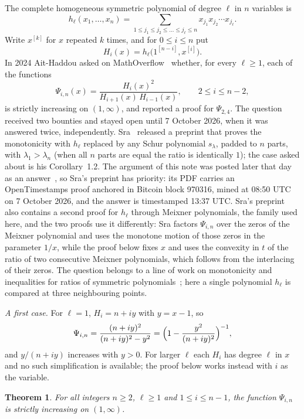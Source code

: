 \documentclass[11pt]{amsart}
\newtheorem{theorem}{Theorem}
\theoremstyle{remark}
\begin{document}
The complete homogeneous symmetric polynomial of degree $\ell$ in $n$ variables is
\[
h_\ell(x_1,\dots,x_n)=\sum_{1\le j_1\le j_2\le\dots\le j_\ell\le n}x_{j_1}x_{j_2}\cdots x_{j_\ell}.
\]
Write $x^{[k]}$ for $x$ repeated $k$ times, and for $0\le i\le n$ put
\[
H_i(x)=h_\ell\bigl(1^{[n-i]},x^{[i]}\bigr).
\]
In 2024 Ait-Haddou asked on MathOverflow~\cite{MO} whether, for every $\ell\ge1$, each of the functions
\[
\Psi_{i,n}(x)=\frac{H_i(x)^2}{H_{i+1}(x)\,H_{i-1}(x)},\qquad 2\le i\le n-2,
\]
is strictly increasing on $(1,\infty)$, and reported a proof for $\Psi_{2,4}$. The question received two bounties and stayed open until 7 October 2026, when it was answered twice, independently. Sra~\cite{SraT} released a preprint that proves the monotonicity with $h_\ell$ replaced by any Schur polynomial $s_\lambda$, padded to $n$ parts, with $\lambda_1>\lambda_n$ (when all $n$ parts are equal the ratio is identically $1$); the case asked about is his Corollary~1.2. The argument of this note was posted later that day as an answer~\cite{MOA}, so Sra's preprint has priority: its PDF carries an OpenTimestamps proof anchored in Bitcoin block 970316, mined at 08:50 UTC on 7 October 2026, and the answer is timestamped 13:37 UTC. Sra's preprint also contains a second proof for $h_\ell$ through Meixner polynomials, the family used here, and the two proofs use it differently: Sra factors $\Psi_{i,n}$ over the zeros of the Meixner polynomial and uses the monotone motion of those zeros in the parameter $1/x$, while the proof below fixes $x$ and uses the convexity in $t$ of the ratio of two consecutive Meixner polynomials, which follows from the interlacing of their zeros. The question belongs to a line of work on monotonicity and inequalities for ratios of symmetric polynomials~\cite{CGS,Sra,AHM,KT,XY,MS}; here a single polynomial $h_\ell$ is compared at three neighbouring points.

\emph{A first case.} For $\ell=1$, $H_i=n+iy$ with $y=x-1$, so
\[
\Psi_{i,n}=\frac{(n+iy)^2}{(n+iy)^2-y^2}=\Bigl(1-\frac{y^2}{(n+iy)^2}\Bigr)^{-1},
\]
and $y/(n+iy)$ increases with $y>0$. For larger $\ell$ each $H_i$ has degree $\ell$ in $x$ and no such simplification is available; the proof below works instead with $i$ as the variable.

\begin{theorem}\label{thm:main}
For all integers $n\ge2$, $\ell\ge1$ and $1\le i\le n-1$, the function $\Psi_{i,n}$ is strictly increasing on $(1,\infty)$.
\end{theorem}
\end{document}
